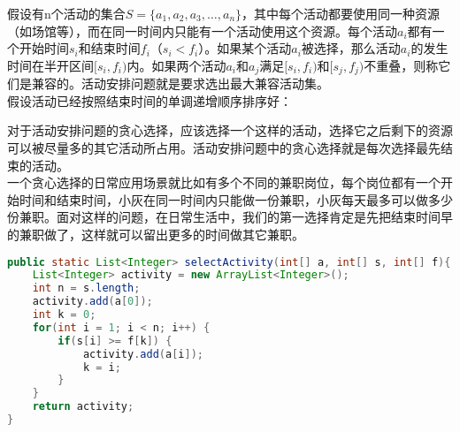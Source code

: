 假设有n个活动的集合$ S = \{a_1, a_2, a_3, \dots, a_n\} $，其中每个活动都要使用同一种资源（如场馆等），而在同一时间内只能有一个活动使用这个资源。每个活动$ a_i $都有一个开始时间$ s_i $和结束时间$ f_i $（$ s_i < f_i $）。如果某个活动$ a_i $被选择，那么活动$ a_i $的发生时间在半开区间$ [s_i, f_i) $内。如果两个活动$ a_i $和$ a_j $满足$ [s_i, f_i) $和$ [s_j, f_j) $不重叠，则称它们是兼容的。活动安排问题就是要求选出最大兼容活动集。 \\

假设活动已经按照结束时间的单调递增顺序排序好：

\begin{table}[H]
    \centering
    \caption{活动安排}
\end{table}

对于活动安排问题的贪心选择，应该选择一个这样的活动，选择它之后剩下的资源可以被尽量多的其它活动所占用。活动安排问题中的贪心选择就是每次选择最先结束的活动。 \\

一个贪心选择的日常应用场景就比如有多个不同的兼职岗位，每个岗位都有一个开始时间和结束时间，小灰在同一时间内只能做一份兼职，小灰每天最多可以做多少份兼职。面对这样的问题，在日常生活中，我们的第一选择肯定是先把结束时间早的兼职做了，这样就可以留出更多的时间做其它兼职。 \\


\begin{lstlisting}[language=Java]
public static List<Integer> selectActivity(int[] a, int[] s, int[] f){
    List<Integer> activity = new ArrayList<Integer>();
    int n = s.length;
    activity.add(a[0]);
    int k = 0;
    for(int i = 1; i < n; i++) {
        if(s[i] >= f[k]) {
            activity.add(a[i]);
            k = i;
        }
    }
    return activity;
}
\end{lstlisting}

